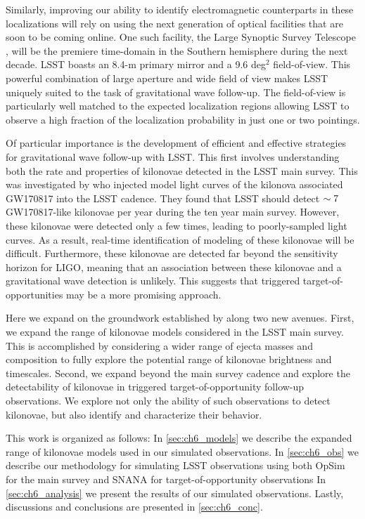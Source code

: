 Similarly, improving our ability to identify electromagnetic counterparts in these localizations will rely on using the next generation of optical facilities that are soon to be coming online. One such facility, the Large Synoptic Survey Telescope \citep[LSST,][]{Ivezic+09}, will be the premiere time-domain in the Southern hemisphere during the next decade. LSST boasts an 8.4-m primary mirror and a 9.6 deg$^2$ field-of-view. This powerful combination of large aperture and wide field of view makes LSST uniquely suited to the task of gravitational wave follow-up. The field-of-view is particularly well matched to the expected localization regions allowing LSST to observe a high fraction of the localization probability in just one or two pointings.

Of particular importance is the development of efficient and effective strategies for gravitational wave follow-up with LSST. This first involves understanding both the rate and properties of kilonovae detected in the LSST main survey. This was investigated by \citet{Scolnic+18} who injected model light curves of the kilonova associated GW170817 \citep{Cowp+17} into the LSST cadence. They found that LSST should detect $\sim7$ GW170817-like kilonovae per year during the ten year main survey. However, these kilonovae were detected only a few times, leading to poorly-sampled light curves. As a result, real-time identification of modeling of these kilonovae will be difficult. Furthermore, these kilonovae are detected far beyond the sensitivity horizon for LIGO, meaning that an association between these kilonovae and a gravitational wave detection is unlikely. This suggests that triggered target-of-opportunities may be a more promising approach.

Here we expand on the groundwork established by \citet{Scolnic+18} along two new avenues. First, we expand the range of kilonovae models considered in the LSST main survey. This is accomplished by considering a wider range of ejecta masses and composition to fully explore the potential range of kilonovae brightness and timescales. Second, we expand beyond the main survey cadence and explore the detectability of kilonovae in triggered target-of-opportunity follow-up observations. We explore not only the ability of such observations to detect kilonovae, but also identify and characterize their behavior. 

This work is organized as follows: In \cref{sec:ch6_models} we describe the expanded range of kilonovae models used in our simulated observations. In \cref{sec:ch6_obs} we describe our methodology for simulating LSST observations using both OpSim for the main survey and SNANA for target-of-opportunity observations In \cref{sec:ch6_analysis} we present the results of our simulated observations. Lastly, discussions and conclusions are presented in \cref{sec:ch6_conc}.

